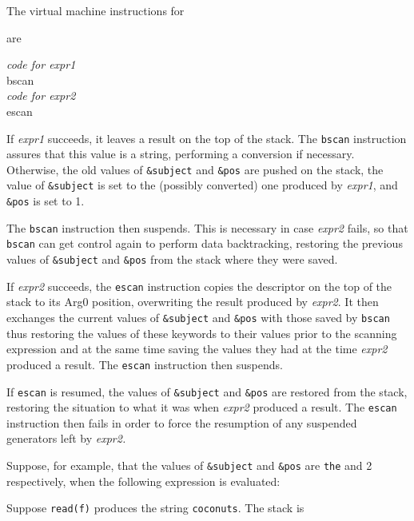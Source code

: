 The virtual machine instructions for


are
\begin{iconcode}
\>\textit{code for expr1}\\
\>bscan\\
\>\textit{code for expr2}\\
\>escan
\end{iconcode}


If \textit{expr1} succeeds, it leaves a result on the top of the
stack. The \texttt{bscan} instruction assures that this value is a
string, performing a conversion if necessary. Otherwise, the old
values of \texttt{\&subject} and \texttt{\&pos} are pushed on the
stack, the value of \texttt{\&subject} is set to the (possibly
converted) one produced by \textit{expr1}, and \texttt{\&pos} is set
to 1.


The \texttt{bscan} instruction then suspends. This is necessary in
case \textit{expr2} fails, so that \texttt{bscan} can get control
again to perform data backtracking, restoring the previous values of
\texttt{\&subject} and \texttt{\&pos} from the stack where they were
saved.


If \textit{expr2} succeeds, the \texttt{escan} instruction copies the
descriptor on the top of the stack to its Arg0 position, overwriting
the result produced by \textit{expr2}. It then exchanges the current
values of \texttt{\&subject} and \texttt{\&pos} with those saved by
\texttt{bscan} thus restoring the values of these keywords to their
values prior to the scanning expression and at the same time saving
the values they had at the time \textit{expr2} produced a result. The
\texttt{escan} instruction then suspends.

If \texttt{escan} is resumed, the values of \texttt{\&subject} and
\texttt{\&pos} are restored from the stack, restoring the situation to
what it was when \textit{expr2} produced a result. The \texttt{escan}
instruction then fails in order to force the resumption of any
suspended generators left by \textit{expr2.}

Suppose, for example, that the values of \texttt{\&subject} and
\texttt{\&pos} are \texttt{{\textquotedbl}the{\textquotedbl}} and 2
respectively, when the following expression is evaluated:


Suppose \texttt{read(f)} produces the string
\texttt{{\textquotedbl}coconuts{\textquotedbl}}. The stack is

